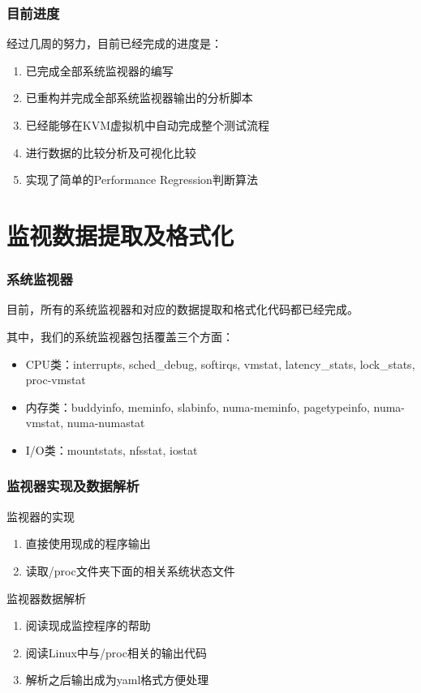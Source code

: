 \documentclass[xcolor=dvipsnames,11pt]{beamer}
\begin{document}
\begin{frame}
\frametitle{目前进度}
经过几周的努力，目前已经完成的进度是：
\begin{enumerate}
\item 已完成全部系统监视器的编写
\item 已重构并完成全部系统监视器输出的分析脚本
\item 已经能够在KVM虚拟机中自动完成整个测试流程
\item 进行数据的比较分析及可视化比较
\item 实现了简单的Performance Regression判断算法
\end{enumerate}
\end{frame}



\section{监视数据提取及格式化}
\begin{frame}
\frametitle{系统监视器}
目前，所有的系统监视器和对应的数据提取和格式化代码都已经完成。

其中，我们的系统监视器包括覆盖三个方面：

\begin{itemize}
\item CPU类：interrupts, sched\_debug, softirqs, vmstat, latency\_stats, lock\_stats, proc-vmstat
\item 内存类：buddyinfo, meminfo, slabinfo, numa-meminfo, pagetypeinfo, numa-vmstat, numa-numastat
\item I/O类：mountstats, nfsstat, iostat
\end{itemize}
\end{frame}

\begin{frame}
\frametitle{监视器实现及数据解析}
\begin{block}{监视器的实现}
\begin{enumerate}
\item 直接使用现成的程序输出
\item 读取/proc文件夹下面的相关系统状态文件
\end{enumerate}
\end{block}
\begin{block}{监视器数据解析}
\begin{enumerate}
\item 阅读现成监控程序的帮助
\item 阅读Linux中与/proc相关的输出代码
\item 解析之后输出成为yaml格式方便处理
\end{enumerate}
\end{block}
\end{frame}
\end{document}

